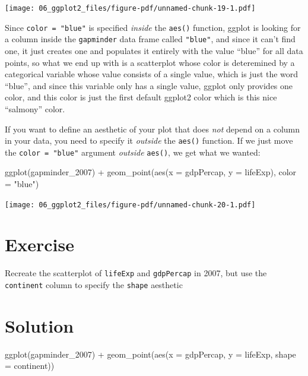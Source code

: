 \documentclass[
  letterpaper,
  DIV=11,
  numbers=noendperiod]{scrreprt}
\newenvironment{Shaded}{\begin{snugshade}}{\end{snugshade}}
\newcommand{\AttributeTok}[1]{\textcolor[rgb]{0.40,0.45,0.13}{#1}}
\newcommand{\FunctionTok}[1]{\textcolor[rgb]{0.28,0.35,0.67}{#1}}
\newcommand{\NormalTok}[1]{\textcolor[rgb]{0.00,0.23,0.31}{#1}}
\newcommand{\SpecialCharTok}[1]{\textcolor[rgb]{0.37,0.37,0.37}{#1}}
\newcommand{\StringTok}[1]{\textcolor[rgb]{0.13,0.47,0.30}{#1}}
\begin{document}
\texttt{[image: 06\_ggplot2\_files/figure-pdf/unnamed-chunk-19-1.pdf]}

Since \texttt{color\ =\ "blue"} is specified \emph{inside} the
\texttt{aes()} function, ggplot is looking for a column inside the
\texttt{gapminder} data frame called \texttt{"blue"}, and since it can't
find one, it just creates one and populates it entirely with the value
``blue'' for all data points, so what we end up with is a scatterplot
whose color is deteremined by a categorical variable whose value
consists of a single value, which is just the word ``blue'', and since
this variable only has a single value, ggplot only provides one color,
and this color is just the first default ggplot2 color which is this
nice ``salmony'' color.

If you want to define an aesthetic of your plot that does \emph{not}
depend on a column in your data, you need to specify it \emph{outside}
the \texttt{aes()} function. If we just move the
\texttt{color\ =\ "blue"} argument \emph{outside} \texttt{aes()}, we get
what we wanted:

\begin{Shaded}
\begin{Highlighting}[]
\FunctionTok{ggplot}\NormalTok{(gapminder\_2007) }\SpecialCharTok{+} 
  \FunctionTok{geom\_point}\NormalTok{(}\FunctionTok{aes}\NormalTok{(}\AttributeTok{x =}\NormalTok{ gdpPercap, }\AttributeTok{y =}\NormalTok{ lifeExp), }\AttributeTok{color =} \StringTok{"blue"}\NormalTok{)}
\end{Highlighting}
\end{Shaded}

\texttt{[image: 06\_ggplot2\_files/figure-pdf/unnamed-chunk-20-1.pdf]}

\section{Exercise}

Recreate the scatterplot of \texttt{lifeExp} and \texttt{gdpPercap} in
2007, but use the \texttt{continent} column to specify the
\texttt{shape} aesthetic

\section{Solution}

\begin{Shaded}
\begin{Highlighting}[]
\FunctionTok{ggplot}\NormalTok{(gapminder\_2007) }\SpecialCharTok{+} 
  \FunctionTok{geom\_point}\NormalTok{(}\FunctionTok{aes}\NormalTok{(}\AttributeTok{x =}\NormalTok{ gdpPercap, }
                 \AttributeTok{y =}\NormalTok{ lifeExp, }
                 \AttributeTok{shape =}\NormalTok{ continent))}
\end{Highlighting}
\end{Shaded}
\end{document}
